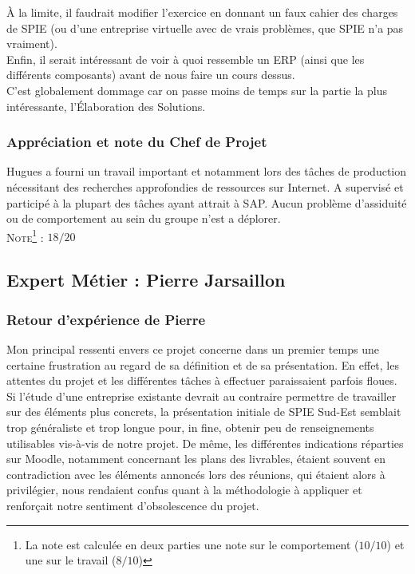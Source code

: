 À la limite, il faudrait modifier l’exercice en donnant un faux cahier des charges de SPIE (ou d’une entreprise virtuelle avec de vrais problèmes, que SPIE n'a pas vraiment). \\

Enfin, il serait intéressant de voir à quoi ressemble un ERP (ainsi que les différents composants) avant de nous faire un cours dessus. \\

C’est globalement dommage car on passe moins de temps sur la partie la plus intéressante, l'\'Elaboration des Solutions.

\subsubsection{Appréciation et note du Chef de Projet}

Hugues a fourni un travail important et notamment lors des tâches de production nécessitant des recherches approfondies de ressources sur Internet. A supervisé et participé à la plupart des tâches ayant attrait à SAP. Aucun problème d’assiduité ou de comportement au sein du groupe n’est a déplorer.\\

\noindent\textsc{Note\footnote{La note est calculée en deux parties une note sur le comportement ($10/10$) et une sur le travail ($8/10$)} :} $18/20$

\subsection{Expert Métier : Pierre Jarsaillon}

\subsubsection{Retour d'expérience de Pierre}

Mon principal ressenti envers ce projet concerne dans un premier temps une certaine frustration au regard de sa définition et de sa présentation. En effet, les attentes du projet et les différentes tâches à effectuer paraissaient parfois floues. Si l’étude d’une entreprise existante devrait au contraire permettre de travailler sur des éléments plus concrets, la présentation initiale de SPIE Sud-Est semblait trop généraliste et trop longue pour, in fine, obtenir peu de renseignements utilisables vis-à-vis de notre projet. De même, les différentes indications réparties sur Moodle, notamment concernant les plans des livrables, étaient souvent en contradiction avec les éléments annoncés lors des réunions, qui étaient alors à privilégier, nous rendaient confus quant à la méthodologie à appliquer et renforçait notre sentiment d’obsolescence du projet. \\
 
